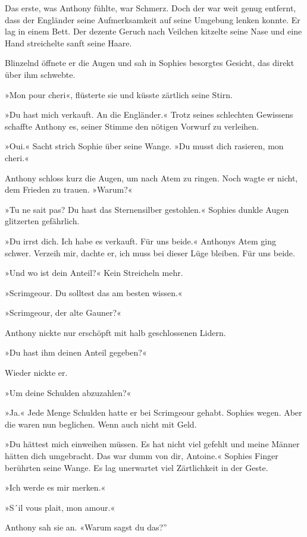 \tb

Das erste, was Anthony fühlte, war Schmerz. Doch der war weit genug
entfernt, dass der Engländer seine Aufmerksamkeit auf seine
Umgebung lenken konnte. Er lag in einem Bett. Der dezente Geruch
nach Veilchen kitzelte seine Nase und eine Hand streichelte sanft
seine Haare.

Blinzelnd öffnete er die Augen und sah in Sophies besorgtes
Gesicht, das direkt über ihm schwebte.

»Mon pour cheri«, flüsterte sie und küsste zärtlich seine Stirn.

»Du hast mich verkauft. An die Engländer.« Trotz seines schlechten
Gewissens schaffte Anthony es, seiner Stimme den nötigen Vorwurf zu
verleihen.

»Oui.« Sacht strich Sophie über seine Wange. »Du musst dich
rasieren, mon cheri.«

Anthony schloss kurz die Augen, um nach Atem zu ringen. Noch wagte
er nicht, dem Frieden zu trauen. »Warum?«

»Tu ne sait pas? Du hast das Sternensilber gestohlen.« Sophies
dunkle Augen glitzerten gefährlich.

»Du irrst dich. Ich habe es verkauft. Für uns beide.« Anthonys Atem
ging schwer. Verzeih mir, dachte er, ich muss bei dieser Lüge
bleiben. Für uns beide.

»Und wo ist dein Anteil?« Kein Streicheln mehr.

»Scrimgeour. Du solltest das am besten wissen.«

»Scrimgeour, der alte Gauner?«

Anthony nickte nur erschöpft mit halb geschlossenen Lidern.

»Du hast ihm deinen Anteil gegeben?«

Wieder nickte er.

»Um deine Schulden abzuzahlen?«

»Ja.« Jede Menge Schulden hatte er bei Scrimgeour gehabt. Sophies
wegen. Aber die waren nun beglichen. Wenn auch nicht mit Geld.

»Du hättest mich einweihen müssen. Es hat nicht viel gefehlt und
meine Männer hätten dich umgebracht. Das war dumm von dir,
Antoine.« Sophies Finger berührten seine Wange. Es lag unerwartet
viel Zärtlichkeit in der Geste.

»Ich werde es mir merken.«

»S´il vous plait, mon amour.«

Anthony sah sie an. «Warum sagst du das?”

